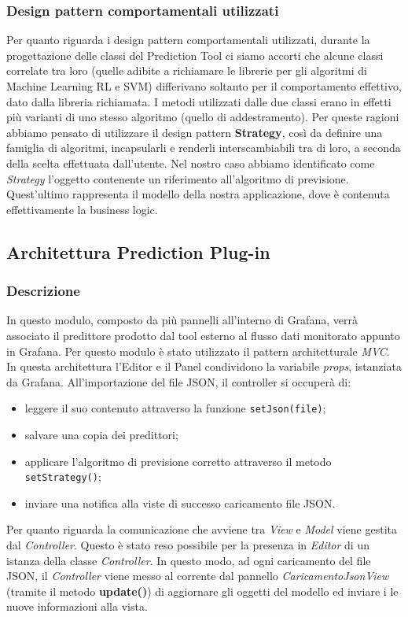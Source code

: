 \subsubsection{Design pattern comportamentali utilizzati}
Per quanto riguarda i design pattern comportamentali utilizzati, durante la progettazione delle classi del Prediction Tool ci siamo accorti che alcune classi correlate tra loro (quelle adibite a richiamare le librerie per gli algoritmi di Machine Learning RL e SVM) differivano soltanto per il comportamento effettivo, dato dalla libreria richiamata. I metodi utilizzati dalle due classi erano in effetti più varianti di uno stesso algoritmo (quello di addestramento). Per queste ragioni abbiamo pensato di utilizzare il design pattern \textbf{Strategy}, così da definire una famiglia di algoritmi, incapsularli e renderli interscambiabili tra di loro, a seconda della scelta effettuata dall’utente.
Nel nostro caso abbiamo identificato come \textit{Strategy} l’oggetto contenente un riferimento all'algoritmo di previsione.
Quest'ultimo rappresenta il modello della nostra applicazione, dove è contenuta effettivamente la business logic.

\pagebreak
\subsection{Architettura Prediction Plug-in}

\subsubsection{Descrizione}
In questo modulo, composto da più pannelli all'interno di Grafana, verrà associato il predittore prodotto dal tool esterno al flusso dati monitorato appunto in Grafana. Per questo modulo è stato utilizzato il pattern architetturale \textit{MVC}.
In questa architettura l’Editor e il Panel condividono la variabile \textit{props}, istanziata da Grafana. 
All’importazione del file JSON, il controller si occuperà di: \begin{itemize}
\item leggere il suo contenuto attraverso la funzione \texttt{setJson(file)};
\item salvare una copia dei predittori;
\item applicare l'algoritmo di previsione corretto attraverso il metodo \texttt{setStrategy()};
\item inviare una notifica alla viste di successo caricamento file JSON.
\end{itemize}

Per quanto riguarda la comunicazione che avviene tra \textit{View} e \textit{Model} viene gestita dal \textit{Controller}. Questo è stato reso possibile per la presenza in \textit{Editor} di un istanza della classe \textit{Controller}. In questo modo, ad ogni caricamento del file JSON, il \textit{Controller} viene messo al corrente dal pannello \textit{CaricamentoJsonView} (tramite il metodo \textbf{update()}) di aggiornare gli oggetti del modello ed inviare i le nuove informazioni alla vista.



